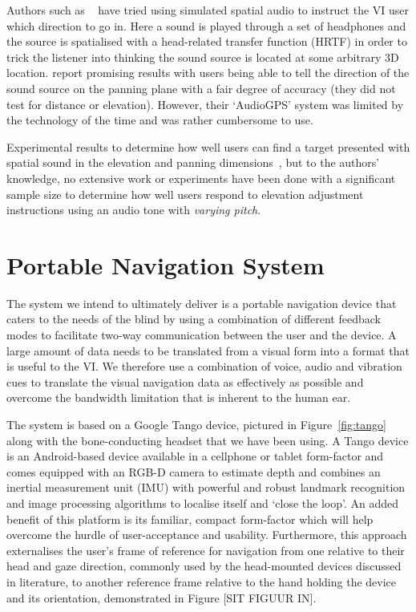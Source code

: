 \documentclass[format=sigconf, review=true, screen=true, anonymous=true]{acmart}
\begin{document}
Authors such as \citeauthor{holland2002audiogps}~\cite{holland2002audiogps} have tried using simulated spatial audio to instruct the VI user which direction to go in. Here a sound is played through a set of headphones and the source is spatialised with a head-related transfer function (HRTF) in order to trick the listener into thinking the sound source is located at some arbitrary 3D location. \citeauthor{holland2002audiogps} report promising results with users being able to tell the direction of the sound source on the panning plane with a fair degree of accuracy (they did not test for distance or elevation). However, their `AudioGPS' system was limited by the technology of the time and was rather cumbersome to use. 

Experimental results to determine how well users can find a target presented with spatial sound in the elevation and panning dimensions~\cite{katz2011spatial, zwiers2001spatial}, but to the authors' knowledge, no extensive work or experiments have been done with a significant sample size to determine how well users respond to elevation adjustment instructions using an audio tone with \emph{varying pitch}. 

\section{Portable Navigation System}

The system we intend to ultimately deliver is a portable navigation device that caters to the needs of the blind by using a combination of different feedback modes to facilitate two-way communication between the user and the device. A large amount of data needs to be translated from a visual form into a format that is useful to the VI. We therefore use a combination of voice, audio and vibration cues to translate the visual navigation data as effectively as possible and overcome the bandwidth limitation that is inherent to the human ear. 

The system is based on a Google Tango device, pictured in Figure~\ref{fig:tango} along with the bone-conducting headset that we have been using. A Tango device is an Android-based device available in a cellphone or tablet form-factor and comes equipped with an RGB-D camera to estimate depth and combines an inertial measurement unit (IMU) with powerful and robust landmark recognition and image processing algorithms to localise itself and `close the loop'. An added benefit of this platform is its familiar, compact form-factor which will help overcome the hurdle of user-acceptance and usability. Furthermore, this approach externalises the user's frame of reference for navigation from one relative to their head and gaze direction, commonly used by the head-mounted devices discussed in literature, to another reference frame relative to the hand holding the device and its orientation, demonstrated in Figure [SIT FIGUUR IN]. 
\end{document}
